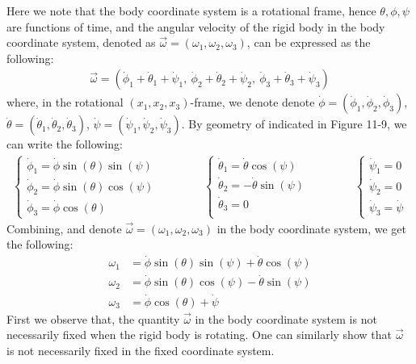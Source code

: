 \documentclass[11pt,oneside]{book}
\theoremstyle{break}
\theoremstyle{break}
\begin{document}
Here we note that the body coordinate system is a rotational frame, hence $\theta, \phi, \psi$ are functions of time, and the angular velocity of the rigid body in the body coordinate system, denoted as $\vec{\omega} = (\omega_1,\omega_2,\omega_3)$, can be expressed as the following:
\begin{align*}
\vec{\omega} = (\dot{\phi}_1+ \dot{\theta}_1 + \dot{\psi}_1,\  \dot{\phi}_2+ \dot{\theta}_2 + \dot{\psi}_2, \ \dot{\phi}_3+ \dot{\theta}_3 + \dot{\psi}_3)
\end{align*}
where, in the rotational $(x_1,x_2,x_3)$-frame, we denote denote $\dot{\phi} = (\dot{\phi}_1, \dot{\phi}_2,\dot{\phi}_3)$, $\dot{\theta} = (\dot{\theta}_1, \dot{\theta}_2,\dot{\theta}_3)$, $\dot{\psi} = (\dot{\psi}_1, \dot{\psi}_2,\dot{\psi}_3)$. By geometry of indicated in Figure 11-9, we can write the following:
\begin{align*}
\begin{cases}
\dot{\phi}_1 = \dot{\phi} \sin(\theta) \sin(\psi)\\ \dot{\phi}_2 = \dot{\phi} \sin(\theta) \cos(\psi)\\
\dot{\phi}_3 = \dot{\phi}\cos(\theta)
\end{cases}
\qquad\qquad
\begin{cases}\dot{\theta}_1 = \dot{\theta} \cos(\psi) \\
\dot{\theta}_2 = -\dot{\theta}\sin(\psi) \\
\dot{\theta}_3 = 0\\
\end{cases}
\qquad\qquad
\begin{cases}
\dot{\psi}_1 = 0\\
\dot{\psi}_2 = 0\\
\dot{\psi}_3 = \dot{\psi}
\end{cases}
\end{align*}
Combining, and denote $\vec{\omega} = (\omega_1, \omega_2,\omega_3)$ in the body coordinate system, we get the following:
\begin{align*}
\omega_1 &= \dot{\phi}\sin(\theta)\sin(\psi) + \dot{\theta}\cos(\psi)\\
\omega_2 &= \dot{\phi}\sin(\theta) \cos(\psi) - \dot{\theta}\sin(\psi) \\
\omega_3 &= \dot{\phi}\cos(\theta) + \dot{\psi}
\end{align*}
First we observe that, the quantity $\vec{\omega}$ in the body coordinate system is not necessarily fixed when the rigid body is rotating. One can similarly show that $\vec{\omega}$ is not necessarily fixed in the fixed coordinate system. \\
\end{document}
